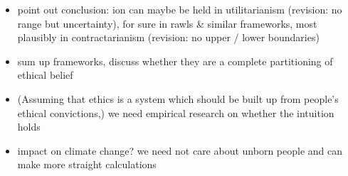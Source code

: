 \begin{itemize} \item point out conclusion: ion can maybe be held in utilitarianism (revision: no range but uncertainty), for sure in rawls \& similar frameworks, most plausibly in contractarianism (revision: no upper / lower boundaries) \item sum up frameworks, discuss whether they are a complete partitioning of ethical belief \item (Assuming that ethics is a system which should be built up from people’s ethical convictions,) we need empirical research on whether the intuition holds \item impact on climate change? we need not care about unborn people and can make more straight calculations \end{itemize}